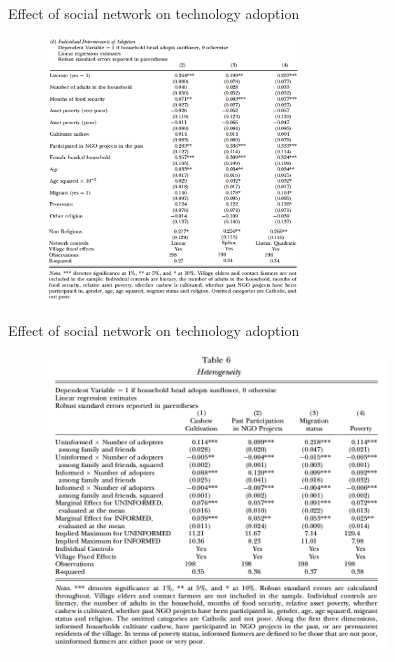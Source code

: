 \documentclass{beamer}
\begin{document}
\begin{frame}{Effect of social network on technology adoption}{}
\begin{figure}[h]
\begin{centering}
  \includegraphics[width=0.6\textwidth]{01table5b}
   \label{fig:01table5b}
\end{centering}
\end{figure}
\end{frame}

\begin{frame}{Effect of social network on technology adoption}{}
\begin{figure}[h]
\begin{centering}
  \includegraphics[width=0.8\textwidth]{01table6}
   \label{fig:01table6}
\end{centering}
\end{figure}
\end{frame}
\end{document}
